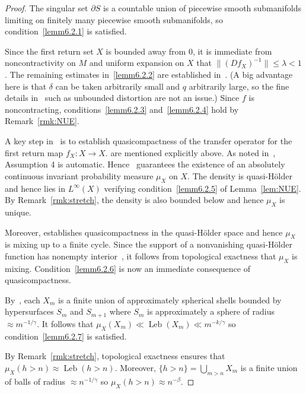 \documentclass[10pt]{amsart}
\theoremstyle{definition}\newtheorem{defi}[theo]{Definition}\newtheorem{rema}[theo]{Remark}\newtheorem{exam}[theo]{Example}\newtheorem{exem}[theo]{Example}\newtheorem{nota}[theo]{Notation}
\DeclareMathOperator{\Leb}{Leb}
\newcommand*{\MK}{\mkern 2mu}
\begin{document}
\begin{proof}
The singular set $\partial S$ is a countable union of piecewise smooth submanifolds limiting on finitely many piecewise smooth submanifolds, so condition~\eqref{lemm6.2.1} is satisfied.

Since the first return set $X$ is bounded away from $0$, it is immediate from noncontractivity on $M$ and uniform expansion on $X$ that $\|(Df_X)^{-1}\|\le\lambda<1$. The remaining estimates in~\eqref{lemm6.2.2} are established in~\cite{HuVaienti09,HuVaientiapp}. (A big advantage here is that $\delta$ can be taken arbitrarily small and $q$ arbitrarily large, so the fine details in~\cite{HuVaienti09,HuVaientiapp} such as unbounded distortion are not an issue.) Since $f$ is noncontracting, conditions~\eqref{lemm6.2.3} and~\eqref{lemm6.2.4} hold by Remark~\ref{rmk:NUE}.

A key step in~\cite{HuVaienti09} is to establish quasicompactness of the transfer operator for the first return map $f_X:X\to X$. \cite[Theorem~A$\MK$(Assumptions~1--3)]{HuVaienti09} are mentioned explicitly above. As noted in~\cite[Example~5.1]{HuVaientiapp}, Assumption 4 is automatic. Hence~\cite[Theorem~A]{HuVaienti09} guarantees the existence of an absolutely continuous invariant probability measure $\mu_X$ on $X$. The density is quasi-H\"older and hence lies in $L^\infty(X)$ verifying condition~\eqref{lemm6.2.5} of Lemma~\ref{lem:NUE}. By Remark~\ref{rmk:stretch}, the density is also bounded below and hence $\mu_X$ is unique.

Moreover, \cite[Theorem~A]{HuVaienti09} establishes quasicompactness in the quasi-H\"older space and hence $\mu_X$ is mixing up to a finite cycle. Since the support of a nonvanishing quasi-H\"older function has nonempty interior~\cite[Lemma~3.1]{Saussol00}, it follows from topological exactness that $\mu_X$ is mixing. Condition~\eqref{lemm6.2.6} is now an immediate consequence of quasicompactness.

By~\cite{HuVaienti09}, each $X_m$ is a finite union of approximately spherical shells bounded by hypersurfaces $S_m$ and $S_{m+1}$ where $S_m$ is approximately a sphere of radius $\approx m^{-1/\gamma}$. It follows that $\mu_X(X_m)\ll\Leb(X_m)\ll m^{-k/\gamma}$ so condition~\eqref{lemm6.2.7} is satisfied.

By Remark~\ref{rmk:stretch}, topological exactness ensures that $\mu_X(h>n)\approx\Leb(h>n)$. Moreover, $\{h>n\}=\bigcup_{m>n}X_m$ is a finite union of balls of radius $\approx n^{-1/\gamma}$ so $\mu_X(h>n)\approx n^{-\beta}$.
\end{proof}
\end{document}
